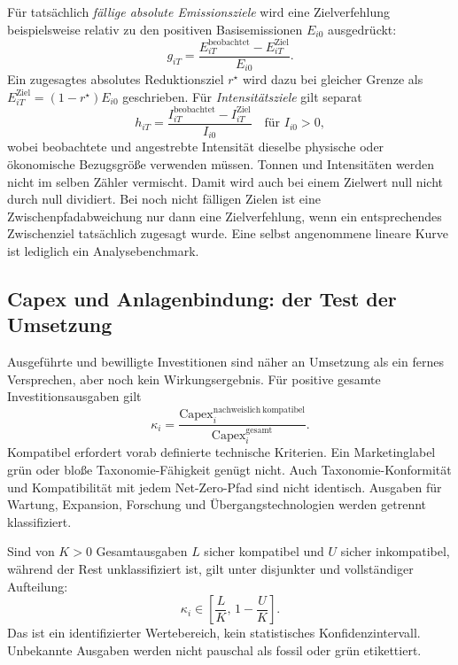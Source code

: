 \documentclass[11pt,a4paper]{article}
\begin{document}
Für tatsächlich \emph{fällige absolute Emissionsziele} wird eine Zielverfehlung beispielsweise relativ zu den positiven Basisemissionen $E_{i0}$ ausgedrückt:
\begin{equation}
g_{iT}=\frac{E_{iT}^{\mathrm{beobachtet}}-E_{iT}^{\mathrm{Ziel}}}{E_{i0}}.
\end{equation}
Ein zugesagtes absolutes Reduktionsziel $r^\star$ wird dazu bei gleicher Grenze als $E_{iT}^{\mathrm{Ziel}}=(1-r^\star)E_{i0}$ geschrieben. Für \emph{Intensitätsziele} gilt separat
\begin{equation}
h_{iT}=\frac{I_{iT}^{\mathrm{beobachtet}}-I_{iT}^{\mathrm{Ziel}}}{I_{i0}}\quad\text{für }I_{i0}>0,
\end{equation}
wobei beobachtete und angestrebte Intensität dieselbe physische oder ökonomische Bezugsgröße verwenden müssen. Tonnen und Intensitäten werden nicht im selben Zähler vermischt. Damit wird auch bei einem Zielwert null nicht durch null dividiert. Bei noch nicht fälligen Zielen ist eine Zwischenpfadabweichung nur dann eine Zielverfehlung, wenn ein entsprechendes Zwischenziel tatsächlich zugesagt wurde. Eine selbst angenommene lineare Kurve ist lediglich ein Analysebenchmark.

\subsection{Capex und Anlagenbindung: der Test der Umsetzung}
Ausgeführte und bewilligte Investitionen sind näher an Umsetzung als ein fernes Versprechen, aber noch kein Wirkungsergebnis. Für positive gesamte Investitionsausgaben gilt
\begin{equation}
\kappa_i=\frac{\mathrm{Capex}_i^{\mathrm{nachweislich\ kompatibel}}}{\mathrm{Capex}_i^{\mathrm{gesamt}}}.
\end{equation}
\glqq Kompatibel\grqq{} erfordert vorab definierte technische Kriterien. Ein Marketinglabel \glqq grün\grqq{} oder bloße Taxonomie-Fähigkeit genügt nicht. Auch Taxonomie-Konformität und Kompatibilität mit jedem Net-Zero-Pfad sind nicht identisch. Ausgaben für Wartung, Expansion, Forschung und Übergangstechnologien werden getrennt klassifiziert.

Sind von $K>0$ Gesamtausgaben $L$ sicher kompatibel und $U$ sicher inkompatibel, während der Rest unklassifiziert ist, gilt unter disjunkter und vollständiger Aufteilung:
\begin{equation}
\kappa_i\in\left[\frac{L}{K},\,1-\frac{U}{K}\right].
\end{equation}
Das ist ein identifizierter Wertebereich, kein statistisches Konfidenzintervall. Unbekannte Ausgaben werden nicht pauschal als fossil oder grün etikettiert.
\end{document}
